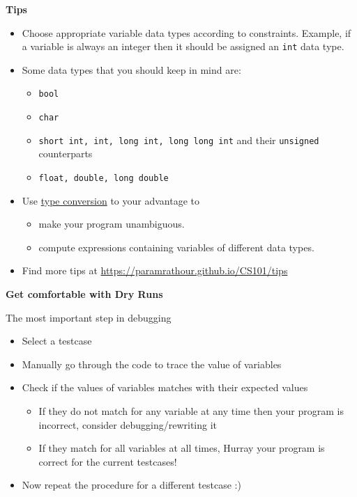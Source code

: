 \begin{center}
	\textbf{\large{Tips}}
\end{center}
\begin{itemize}
\item Choose appropriate variable data types according to constraints. Example, if a variable is always an integer then it should be assigned an \verb!int! data type.
\item Some data types that you should keep in mind are:
	\begin{itemize}
	\item \verb!bool!
	\item \verb!char!
	\item \verb!short int, int, long int, long long int! and their \verb!unsigned! counterparts
	\item \verb!float, double, long double!
	\end{itemize}
\item Use \href{https://www.geeksforgeeks.org/type-conversion-in-c/}{type conversion} to your advantage to
	\begin{itemize}
	\item make your program unambiguous.
	\item compute expressions containing variables of different data types.
	\end{itemize}
\item Find more tips at \url{https://paramrathour.github.io/CS101/tips}
\end{itemize}
\begin{center}
	\textbf{\large{Get comfortable with Dry Runs}}
\end{center}
The most important step in debugging
\begin{itemize}	
\item Select a testcase
\item Manually go through the code to trace the value of variables
\item Check if the values of variables matches with their expected values
\begin{itemize}
	\item If they do not match for any variable at any time then your program is incorrect, consider debugging/rewriting it
	\item If they match for all variables at all times, Hurray your program is correct for the current testcases!
\end{itemize}
\item Now repeat the procedure for a different testcase :)
\end{itemize}